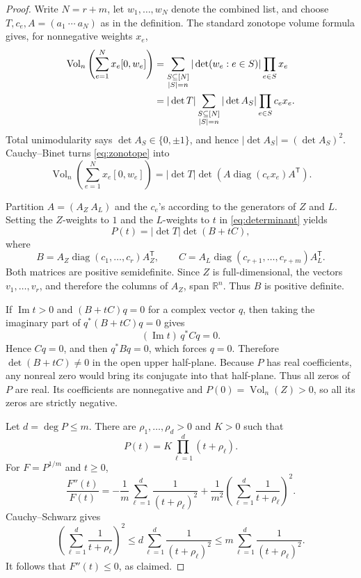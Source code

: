 \documentclass[11pt]{article}
\theoremstyle{definition}
\newcommand{\Vol}{\operatorname{Vol}}
\newcommand{\R}{\mathbb{R}}
\begin{document}
\begin{proof}
Write \(N=r+m\), let \(w_1,\ldots,w_N\) denote the combined list, and choose
\(T,c_e,A=(a_1\ \cdots\ a_N)\) as in the definition.  The standard zonotope
volume formula gives, for nonnegative weights \(x_e\),
\begin{align}
\Vol_n\left(\sum_{e=1}^{N}x_e[0,w_e]\right)
 &=\sum_{\substack{S\subseteq[N]\\|S|=n}}
   |\det(w_e:e\in S)|\prod_{e\in S}x_e \notag\\
 &=|\det T|
   \sum_{\substack{S\subseteq[N]\\|S|=n}}
   |\det A_S|\prod_{e\in S}c_ex_e. \label{eq:zonotope}
\end{align}
Total unimodularity says \(\det A_S\in\{0,\pm1\}\), and hence
\(|\det A_S|=(\det A_S)^2\).  Cauchy--Binet turns \eqref{eq:zonotope} into
\begin{equation}\label{eq:determinant}
\Vol_n\left(\sum_{e=1}^{N}x_e[0,w_e]\right)
=|\det T|\det\!\left(
A\operatorname{diag}(c_ex_e)A^{\mathsf T}\right).
\end{equation}

Partition \(A=(A_Z\ A_L)\) and the \(c_e\)'s according to the generators of
\(Z\) and \(L\).  Setting the \(Z\)-weights to \(1\) and the \(L\)-weights to
\(t\) in \eqref{eq:determinant} yields
\[
P(t)=|\det T|\det(B+tC),
\]
where
\[
B=A_Z\operatorname{diag}(c_1,\ldots,c_r)A_Z^{\mathsf T},
\qquad
C=A_L\operatorname{diag}(c_{r+1},\ldots,c_{r+m})A_L^{\mathsf T}.
\]
Both matrices are positive semidefinite.  Since \(Z\) is full-dimensional,
the vectors \(v_1,\ldots,v_r\), and therefore the columns of \(A_Z\), span
\(\R^n\).  Thus \(B\) is positive definite.

If \(\operatorname{Im}t>0\) and \((B+tC)q=0\) for a complex vector \(q\), then
taking the imaginary part of \(q^*(B+tC)q=0\) gives
\[
(\operatorname{Im}t)\,q^*Cq=0.
\]
Hence \(Cq=0\), and then \(q^*Bq=0\), which forces \(q=0\).  Therefore
\(\det(B+tC)\neq0\) in the open upper half-plane.  Because \(P\) has real
coefficients, any nonreal zero would bring its conjugate into that half-plane.
Thus all zeros of \(P\) are real.  Its coefficients are nonnegative and
\(P(0)=\Vol_n(Z)>0\), so all its zeros are strictly negative.

Let \(d=\deg P\leq m\).  There are \(\rho_1,\ldots,\rho_d>0\) and \(K>0\)
such that
\[
P(t)=K\prod_{\ell=1}^{d}(t+\rho_\ell).
\]
For \(F=P^{1/m}\) and \(t\geq0\),
\[
\frac{F''(t)}{F(t)}
=-\frac1m\sum_{\ell=1}^{d}\frac1{(t+\rho_\ell)^2}
+ \frac1{m^2}\left(\sum_{\ell=1}^{d}\frac1{t+\rho_\ell}\right)^2.
\]
Cauchy--Schwarz gives
\[
\left(\sum_{\ell=1}^{d}\frac1{t+\rho_\ell}\right)^2
\leq d\sum_{\ell=1}^{d}\frac1{(t+\rho_\ell)^2}
\leq m\sum_{\ell=1}^{d}\frac1{(t+\rho_\ell)^2}.
\]
It follows that \(F''(t)\leq0\), as claimed.
\end{proof}
\end{document}
